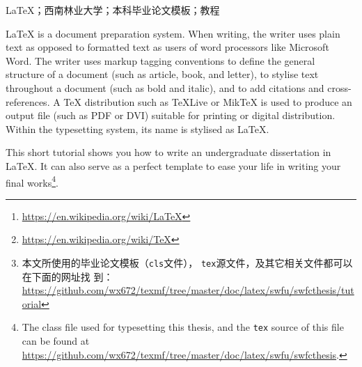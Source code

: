 \documentclass{swfuthesis}
\begin{document}
\maketitle %

\frontmatter

\begin{abstract} %
  \LaTeX{}\footnote{\url{https://en.wikipedia.org/wiki/LaTeX}}是一种基
  于\TeX{}\footnote{\url{https://en.wikipedia.org/wiki/TeX}}的排版系统，由美国电脑学家莱斯
  利·兰伯特在20世纪80年代初期开发。利用这种格式，即使用户没有排版和程序设计的知识也可以充分
  发挥由TEX所提供的强大功能，能在几天，甚至几小时内生成很多具有书籍质量的印刷品。对于生成复
  杂表格和数学公式，这一点表现得尤为突出。因此它非常适用于生成高印刷质量的科技和数学类文档。
  这个系统同样适用于生成从简单的信件到完整书籍的所有其他种类的文档\cite{wiki:latexcn}。

  本文对如何利用\LaTeX{}来撰写西南林业大学本科毕业论文做一个简要的介绍。读者也可以将本文作
  为毕业论文模板来使用\footnote{本文所使用的毕业论文模板（\texttt{cls}文件），
    \texttt{tex}源文件，及其它相关文件都可以在下面的网址找
    到：\url{https://github.com/wx672/texmf/tree/master/doc/latex/swfu/swfcthesis/tutorial}}。
\end{abstract}

\begin{keyword} %
  \LaTeX{}；西南林业大学；本科毕业论文模板；教程
\end{keyword}

\begin{EAbstract} %
  \LaTeX{} is a document preparation system. When writing, the writer uses plain text as
  opposed to formatted text as users of word processors like Microsoft Word. The writer
  uses markup tagging conventions to define the general structure of a document (such as
  article, book, and letter), to stylise text throughout a document (such as bold and
  italic), and to add citations and cross-references. A \TeX{} distribution such as
  \TeX{}Live or Mik\TeX{} is used to produce an output file (such as PDF or DVI) suitable
  for printing or digital distribution. Within the typesetting system, its name is
  stylised as \LaTeX{}\cite{wiki:latex}.

  This short tutorial shows you how to write an undergraduate dissertation in \LaTeX{}. It
  can also serve as a perfect template to ease your life in writing your final
  works\footnote{The class file used for typesetting this thesis, and the \texttt{tex}
    source of this file can be found at
    \url{https://github.com/wx672/texmf/tree/master/doc/latex/swfu/swfcthesis}.}.
\end{EAbstract}
\end{document}
